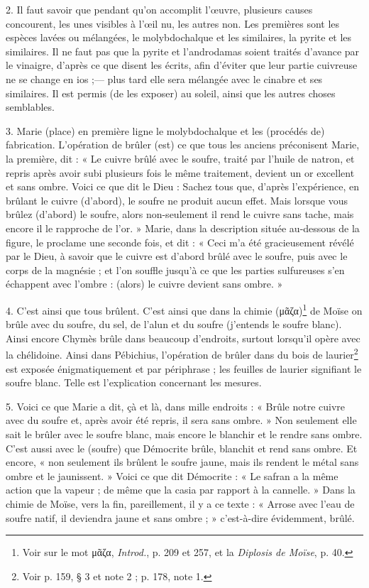 \documentclass[landscape, a4paper, 11pt, oneside, polutonikogreek, french]{article}
\begin{document}
2. Il faut savoir que pendant qu'on accomplit l'œuvre, plusieurs causes concourent, les unes visibles à l'œil nu, les autres non. Les premières sont les espèces lavées ou mélangées, le molybdochalque et les similaires, la pyrite et les similaires. Il ne faut pas que la pyrite et l'androdamas soient traités d'avance par le vinaigre, d'après ce que disent les écrits, afin d'éviter que leur partie cuivreuse ne se change en ios ;--- plus tard elle sera mélangée avec le cinabre et ses similaires. Il est permis (de les exposer) au soleil, ainsi que les autres choses semblables.

3. Marie (place) en première ligne le molybdochalque et les (procédés de) fabrication. L'opération de brûler (est) ce que tous les anciens préconisent Marie, la première, dit : « Le cuivre brûlé avec le soufre, traité par l'huile de natron, et repris après avoir subi plusieurs fois le même traitement, devient un or excellent et sans ombre. Voici ce que dit le Dieu : Sachez tous que, d'après l'expérience, en brûlant le cuivre (d'abord), le soufre ne produit aucun effet. Mais lorsque vous brûlez (d'abord) le soufre, alors non-seulement il rend le cuivre sans tache, mais encore il le rapproche de l'or. » Marie, dans la description située au-dessous de la figure, le proclame une seconde fois, et dit : « Ceci m'a été gracieusement révélé par le Dieu, à savoir que le cuivre est d'abord brûlé avec le soufre, puis avec le corps de la magnésie ; et l'on souffle jusqu'à ce que les parties sulfureuses s'en échappent avec l'ombre : (alors) le cuivre devient sans ombre. »

4. C'est ainsi que tous brûlent. C'est ainsi que dans la chimie (μᾶζα)\footnote{Voir sur le mot μᾶζα, \emph{Introd.}, p. 209 et 257, et la \emph{Diplosis de Moïse}, p. 40.} de Moïse on brûle avec du soufre, du sel, de l'alun et du soufre (j'entends le soufre blanc). Ainsi encore Chymès brûle dans beaucoup d'endroits, surtout lorsqu'il opère avec la chélidoine. Ainsi dans Pébichius, l'opération de brûler dans du bois de laurier\footnote{Voir p. 159, § 3 et note 2 ; p. 178, note 1.} est exposée énigmatiquement et par périphrase ; les feuilles de laurier signifiant le soufre blanc. Telle est l'explication concernant les mesures.

5. Voici ce que Marie a dit, çà et là, dans mille endroits : « Brûle notre cuivre avec du soufre et, après avoir été repris, il sera sans ombre. » Non seulement elle sait le brûler avec le soufre blanc, mais encore le blanchir et le rendre sans ombre. C'est aussi avec le (soufre) que Démocrite brûle, blanchit et rend sans ombre. Et encore, « non seulement ils brûlent le soufre jaune, mais ils rendent le métal sans ombre et le jaunissent. » Voici ce que dit Démocrite : « Le safran a la même action que la vapeur ; de même que la casia par rapport à la cannelle. » Dans la chimie de Moïse, vers la fin, pareillement, il y a ce texte : « Arrose avec l'eau de soufre natif, il deviendra jaune et sans ombre ; » c'est-à-dire évidemment, brûlé.
\end{document}
